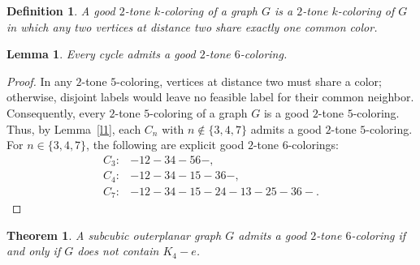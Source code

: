 \documentclass[12pt]{article}
\newtheorem{theorem}{Theorem}
\numberwithin{theorem}{section}
\numberwithin{conjecture}{section}
\numberwithin{corollary}{section}
\numberwithin{example}{section}
\newtheorem{lemma}{Lemma}
\numberwithin{lemma}{section}
\numberwithin{proposition}{section}
\numberwithin{problem}{section}
\numberwithin{remark}{section}
\numberwithin{claim}{theorem}
\newtheorem{definition}{Definition}
\numberwithin{definition}{section}
\begin{document}
\begin{definition}
    A \emph{good} $2$-tone $k$-coloring of a graph $G$ is a $2$-tone $k$-coloring of $G$ in which any two vertices at distance two share exactly one common color. 
\end{definition}

\begin{lemma}\label{l2}
Every cycle admits a good $2$-tone $6$-coloring.
\end{lemma}

\begin{proof}
In any $2$-tone $5$-coloring, vertices at distance two must share a color; otherwise, disjoint labels would leave no feasible label for their common neighbor. Consequently, every $2$-tone $5$-coloring of a graph $G$ is a good $2$-tone $5$-coloring. Thus, by Lemma~\ref{l1}, each $C_n$ with $n\notin\{3,4,7\}$ admits a good $2$-tone $5$-coloring. For $n\in\{3,4,7\}$, the following are explicit good $2$-tone $6$-colorings:
\[
\begin{array}{rl}
C_3: & -12-34-56-,\\
C_4: & -12-34-15-36-,\\
C_7: & -12-34-15-24-13-25-36-.
\end{array}\]\end{proof}

\begin{theorem}\label{t2}
A subcubic outerplanar graph $G$ admits a good $2$-tone $6$-coloring if and only if $G$ does not contain $K_4-e$.
\end{theorem}
\end{document}
